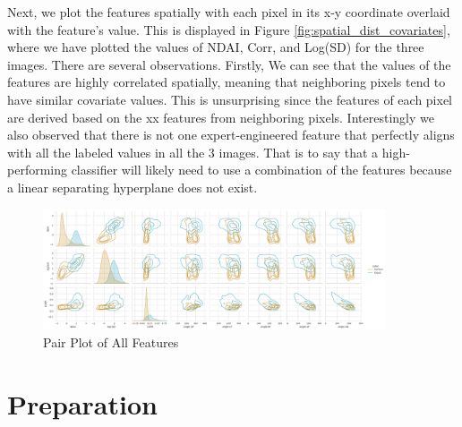 \documentclass[11pt, letterpaper, journal]{IEEEtran}
\begin{document}
Next, we plot the features spatially with each pixel in its x-y coordinate overlaid with the feature's value. This is displayed in Figure \ref{fig:spatial_dist_covariates}, where we have plotted the values of NDAI, Corr, and Log(SD) for the three images. There are several observations. Firstly, We can see that the values of the features are highly correlated spatially, meaning that neighboring pixels tend to have similar covariate values. This is unsurprising since the features of each pixel are derived based on the xx features from neighboring pixels. Interestingly we also observed that there is not one expert-engineered feature that perfectly aligns with all the labeled values in all the 3 images. That is to say that a high-performing classifier will likely need to use a combination of the features because a linear separating hyperplane does not exist.

\begin{figure}[!h]
\centering
\includegraphics[width=0.9\textwidth]{statics/2.c.png}
\caption{Pair Plot of All Features}
\label{fig:covariate_pairplot}
\end{figure}




\section{Preparation}
\end{document}
